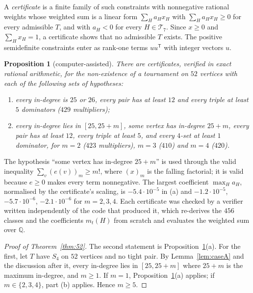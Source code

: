 \documentclass[11pt]{amsart}
\newtheorem{proposition}[theorem]{Proposition}
\theoremstyle{definition}
\theoremstyle{remark}
\begin{document}
A \emph{certificate} is a finite family of such constraints with nonnegative rational weights whose weighted sum is a linear form
$\sum_Ha_Hx_H$ with $\sum_Ha_Hx_H\ge0$ for every admissible $T$, and with $a_H<0$ for every $H\in\mathcal T_7$. Since $x\ge0$ and
$\sum_Hx_H=1$, a certificate shows that no admissible $T$ exists. The positive semidefinite constraints enter as rank-one terms
$u u^{\mathsf T}$ with integer vectors $u$.

\begin{proposition}[computer-assisted]\label{prop:cert}
There are certificates, verified in exact rational arithmetic, for the non-existence of a tournament on $52$ vertices with each of
the following sets of hypotheses:
\begin{enumerate}[label=(\alph*)]
\item every in-degree is $25$ or $26$, every pair has at least $12$ and every triple at least $5$ dominators ($429$ multipliers);
\item every in-degree lies in $[25,25+m]$, some vertex has in-degree $25+m$, every pair has at least $12$, every triple at least $5$,
and every $4$-set at least $1$ dominator, for $m=2$ ($423$ multipliers), $m=3$ ($410$) and $m=4$ ($420$).
\end{enumerate}
\end{proposition}

The hypothesis ``some vertex has in-degree $25+m$'' is used through the valid inequality
$\sum_v(e(v))_m\ge m!$, where $(x)_m$ is the falling factorial; it is valid because $e\ge0$ makes every term nonnegative. The
largest coefficient $\max_Ha_H$, normalised by the certificate's scaling, is $-5.4\cdot10^{-5}$ in (a) and $-1.2\cdot10^{-5}$,
$-5.7\cdot10^{-6}$, $-2.1\cdot10^{-6}$ for $m=2,3,4$. Each certificate was checked by a verifier written independently of the code
that produced it, which re-derives the $456$ classes and the coefficients $m_t(H)$ from scratch and evaluates the weighted sum
over $\mathbb Q$.

\begin{proof}[Proof of Theorem~\ref{thm:52}]
The second statement is Proposition~\ref{prop:cert}(a). For the first, let $T$ have $S_4$ on $52$ vertices and no tight pair. By
Lemma~\ref{lem:caseA} and the discussion after it, every in-degree lies in $[25,25+m]$ where $25+m$ is the maximum in-degree, and
$m\ge1$. If $m=1$, Proposition~\ref{prop:cert}(a) applies; if $m\in\{2,3,4\}$, part (b) applies. Hence $m\ge5$.
\end{proof}
\end{document}
